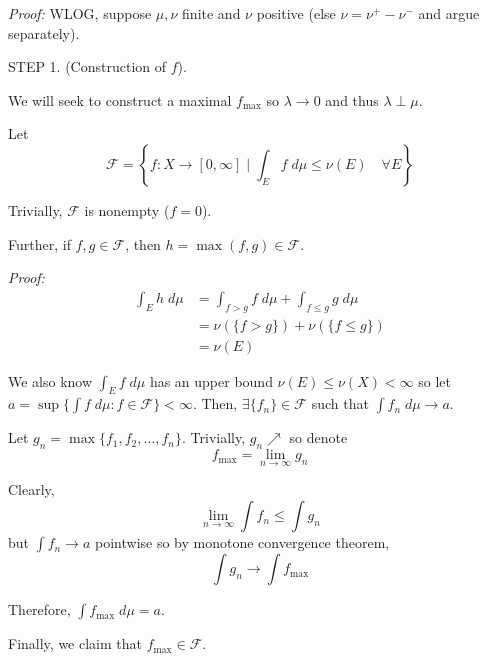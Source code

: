 \documentclass[12pt]{report}
\newcommand{\F}{\mathcal{F}}
\renewcommand{\L}{\text{L}}
\newcommand{\st}{\text{ s.t. }}
\newenvironment*{tbox}[2][gray]{
    \begin{tcolorbox}[
        parbox=false,
        colback=#1!5!white,
        colframe=#1!75!black,
        breakable,
        title={#2}
    ]}
    {\end{tcolorbox}}
\newenvironment*{proof}[1][blue]{
\begin{tcolorbox}[
    parbox=false,
    colback=#1!5!white,
    colframe=#1!75!black,
    breakable
]}
{\end{tcolorbox}}
\begin{document}
        \begin{tbox}{\textbf{Lebesgue-Radon-Nikodym Theorem:} Let $\nu$ be a $\sigma$-finite signed measure and $\mu$ be a $\sigma$-finite positive measure. Then there exists a unique (a.e. in $\mu$) $f \in \L^1_{\mu}$ such that 
            \[\nu = \lambda + f\; d\mu \quad \st\quad  \lambda \perp \mu\]}
            \emph{Proof:} WLOG, suppose $\mu, \nu$ finite and $\nu$ positive (else $\nu = \nu^+ - \nu^-$ and argue separately).

            STEP 1. (Construction of $f$). 
            
            We will seek to construct a maximal $f_{\text{max}}$ so $\lambda \to 0$ and thus $\lambda \perp \mu$. 

            Let 
            \[\F = \left\{f: X \to [0, \infty] \; \bigg\vert \; \int_E f\; d\mu \leq \nu(E) \quad \forall E\right\}\]

            Trivially, $\F$ is nonempty ($f = 0$). 
            
            Further, if $f, g \in \F$, then $h = \max(f, g) \in \F$.
            
            \begin{proof}
                \emph{Proof:} 
                \begin{align*}
                    \int_E h \; d\mu &= \int_{f > g} f \; d\mu + \int_{f \leq g} g \; d\mu\\
                        &= \nu(\{f > g\}) + \nu(\{f \leq g\})\\
                        &= \nu(E)
                \end{align*}
            \end{proof}

            We also know $\int_E f \; d\mu$ has an upper bound $\nu(E) \leq \nu(X) < \infty$ so let $a = \sup \{\int f \; d\mu: f \in \F\} < \infty$. Then, $\exists \{f_n\} \in \F$ such that $\int f_n \; d\mu \to a$. 


            Let $g_n = \max\{f_1, f_2, \dots, f_n\}$. Trivially, $g_n \nearrow$ so denote 
            \[f_{\max} = \lim_{n \to \infty} g_n\]

            Clearly, 
            \[\lim_{n \to \infty} \int f_n \leq \int g_n\]
            but $\int f_n \to a$ pointwise so by monotone convergence theorem, 
            \[\int g_n \to \int f_{\text{max}}\]

            Therefore, $\int f_{\text{max}}\; d\mu = a$.

            Finally, we claim that $f_{\text{max}} \in \F$.


\end{tbox}
\end{document}
